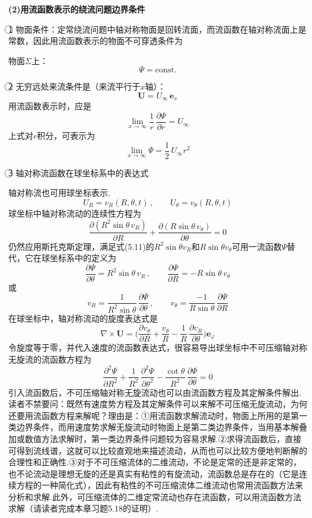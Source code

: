 \textbf{(2)用流函数表示的绕流问题边界条件}

\textcircled{1} 物面条件：定常绕流问题中轴对称物面是回转流面，而流函数在轴对称流面上是常数，因此用流函数表示的物面不可穿透条件为

物面$\Sigma$上：
\begin{equation*}
\Psi=\mathrm{const.}
\tag{5.9}
\end{equation*}

\textcircled{2} 无穷远处来流条件是（来流平行于$x$轴）：
\[
\boldsymbol{U}=U_\infty\,\boldsymbol{e}_x
\]
用流函数表示时，应是
\begin{equation*}
\lim_{x\to\infty}\frac{1}{r}\,\frac{\partial\Psi}{\partial r}=U_\infty
\tag{5.10a}
\end{equation*}
上式对$r$积分，可表示为
\begin{equation*}
\lim_{x\to\infty}\Psi=\frac{1}{2}\,U_\infty r^{2}
\tag{5.10b}
\end{equation*}

\textcircled{3} 轴对称流函数在球坐标系中的表达式

轴对称流也可用球坐标表示.
\[
U_R=v_R(R,\theta,t)\,,\qquad U_\theta=v_\theta(R,\theta,t)
\]
球坐标中轴对称流动的连续性方程为
\begin{equation*}
\frac{\partial(R^{2}\sin\theta\,v_R)}{\partial R}+\frac{\partial(R\sin\theta\,v_\theta)}{\partial\theta}=0
\tag{5.11}
\end{equation*}
仍然应用斯托克斯定理，满足式(5.11)的$R^{2}\sin\theta v_R$和$R\sin\theta v_\theta$可用一流函数$\Psi$替代，它在球坐标系中的定义为
\[
\frac{\partial\Psi}{\partial\theta}=R^{2}\sin\theta\,v_R\,,\qquad \frac{\partial\Psi}{\partial R}=-R\sin\theta\,v_\theta
\]
或
\begin{equation*}
v_R=\frac{1}{R^{2}\sin\theta}\,\frac{\partial\Psi}{\partial\theta}\,,\qquad v_\theta=\frac{-1}{R\sin\theta}\,\frac{\partial\Psi}{\partial R}
\tag{5.12}
\end{equation*}
在球坐标中，轴对称流动的旋度表达式是
\[
\nabla\times\boldsymbol{U}=\Big(\frac{\partial v_\theta}{\partial R}+\frac{v_\theta}{R}-\frac{1}{R}\,\frac{\partial v_R}{\partial\theta}\Big)\boldsymbol{e}_\varphi
\]
令旋度等于零，并代入速度的流函数表达式，很容易导出球坐标中不可压缩轴对称无旋流的流函数方程为
\begin{equation*}
\frac{\partial^{2}\Psi}{\partial R^{2}}+\frac{1}{R^{2}}\,\frac{\partial^{2}\Psi}{\partial\theta^{2}}-\frac{\cot\theta}{R^{2}}\,\frac{\partial\Psi}{\partial\theta}=0
\tag{5.13}
\end{equation*}
引入流函数后，不可压缩轴对称无旋流动也可以由流函数方程及其定解条件解出.读者不禁要问：既然有速度势方程及其定解条件可以来解不可压缩无旋流动，为何还要用流函数方程来解呢？理由是：①用流函数求解流动时，物面上所用的是第一类边界条件，而用速度势求解无旋流动时物面上是第二类边界条件，当用基本解叠加或数值方法求解时，第一类边界条件问题较为容易求解.②求得流函数后，直接可得到流线谱，这就可以比较直观地来描述流动，从而也可以比较方便地判断解的合理性和正确性.③对于不可压缩流体的二维流动，不论是定常的还是非定常的，也不论流动是理想无旋的还是真实有粘性的有旋流动，流函数总是存在的（它是连续方程的一种简化式），因此有粘性的不可压缩流体二维流动也常用流函数方法来分析和求解.此外，可压缩流体的二维定常流动也存在流函数，可以用流函数方法求解（请读者完成本章习题5.18的证明）.


